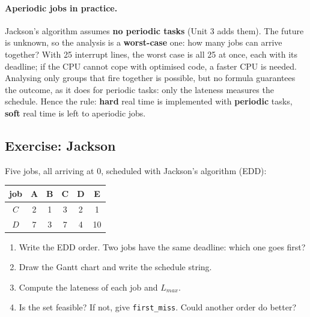 \paragraph{Aperiodic jobs in practice.} Jackson's algorithm assumes \textbf{no periodic tasks} (Unit 3 adds them). The future is unknown, so the analysis is a \textbf{worst-case} one: how many jobs can arrive together? With 25 interrupt lines, the worst case is all 25 at once, each with its deadline; if the CPU cannot cope with optimised code, a faster CPU is needed. Analysing only groups that fire together is possible, but no formula guarantees the outcome, as it does for periodic tasks: only the lateness measures the schedule. Hence the rule: \textbf{hard} real time is implemented with \textbf{periodic} tasks, \textbf{soft} real time is left to aperiodic jobs.

\subsection{Exercise: Jackson}
Five jobs, all arriving at 0, scheduled with Jackson's algorithm (EDD):
\begin{center}
    \begin{tabular}{c | c c c c c}
        \hline
        job & A & B & C & D & E \\
        \hline
        $C$ & 2 & 1 & 3 & 2 & 1 \\
        $D$ & 7 & 3 & 7 & 4 & 10 \\
        \hline
    \end{tabular}
\end{center}
\begin{enumerate}
    \item Write the EDD order. Two jobs have the same deadline: which one goes first?
    \item Draw the Gantt chart and write the schedule string.
    \item Compute the lateness of each job and $L_{max}$.
    \item Is the set feasible? If not, give \texttt{first\_miss}. Could another order do better?
\end{enumerate}

